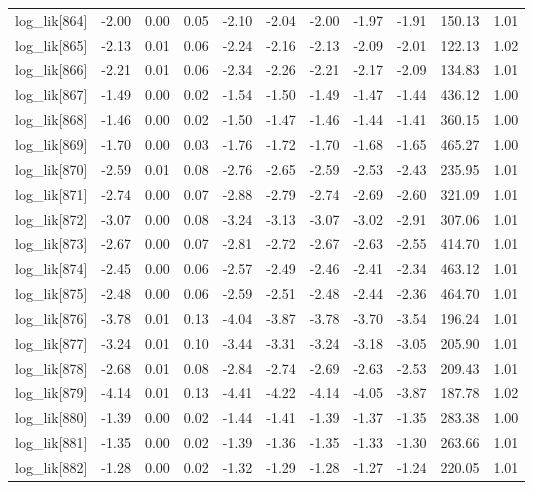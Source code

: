 \begin{table}[ht]
\begin{tabular}{rrrrrrrrrrr}
  log\_lik[864] & -2.00 & 0.00 & 0.05 & -2.10 & -2.04 & -2.00 & -1.97 & -1.91 & 150.13 & 1.01 \\ 
  log\_lik[865] & -2.13 & 0.01 & 0.06 & -2.24 & -2.16 & -2.13 & -2.09 & -2.01 & 122.13 & 1.02 \\ 
  log\_lik[866] & -2.21 & 0.01 & 0.06 & -2.34 & -2.26 & -2.21 & -2.17 & -2.09 & 134.83 & 1.01 \\ 
  log\_lik[867] & -1.49 & 0.00 & 0.02 & -1.54 & -1.50 & -1.49 & -1.47 & -1.44 & 436.12 & 1.00 \\ 
  log\_lik[868] & -1.46 & 0.00 & 0.02 & -1.50 & -1.47 & -1.46 & -1.44 & -1.41 & 360.15 & 1.00 \\ 
  log\_lik[869] & -1.70 & 0.00 & 0.03 & -1.76 & -1.72 & -1.70 & -1.68 & -1.65 & 465.27 & 1.00 \\ 
  log\_lik[870] & -2.59 & 0.01 & 0.08 & -2.76 & -2.65 & -2.59 & -2.53 & -2.43 & 235.95 & 1.01 \\ 
  log\_lik[871] & -2.74 & 0.00 & 0.07 & -2.88 & -2.79 & -2.74 & -2.69 & -2.60 & 321.09 & 1.01 \\ 
  log\_lik[872] & -3.07 & 0.00 & 0.08 & -3.24 & -3.13 & -3.07 & -3.02 & -2.91 & 307.06 & 1.01 \\ 
  log\_lik[873] & -2.67 & 0.00 & 0.07 & -2.81 & -2.72 & -2.67 & -2.63 & -2.55 & 414.70 & 1.01 \\ 
  log\_lik[874] & -2.45 & 0.00 & 0.06 & -2.57 & -2.49 & -2.46 & -2.41 & -2.34 & 463.12 & 1.01 \\ 
  log\_lik[875] & -2.48 & 0.00 & 0.06 & -2.59 & -2.51 & -2.48 & -2.44 & -2.36 & 464.70 & 1.01 \\ 
  log\_lik[876] & -3.78 & 0.01 & 0.13 & -4.04 & -3.87 & -3.78 & -3.70 & -3.54 & 196.24 & 1.01 \\ 
  log\_lik[877] & -3.24 & 0.01 & 0.10 & -3.44 & -3.31 & -3.24 & -3.18 & -3.05 & 205.90 & 1.01 \\ 
  log\_lik[878] & -2.68 & 0.01 & 0.08 & -2.84 & -2.74 & -2.69 & -2.63 & -2.53 & 209.43 & 1.01 \\ 
  log\_lik[879] & -4.14 & 0.01 & 0.13 & -4.41 & -4.22 & -4.14 & -4.05 & -3.87 & 187.78 & 1.02 \\ 
  log\_lik[880] & -1.39 & 0.00 & 0.02 & -1.44 & -1.41 & -1.39 & -1.37 & -1.35 & 283.38 & 1.00 \\ 
  log\_lik[881] & -1.35 & 0.00 & 0.02 & -1.39 & -1.36 & -1.35 & -1.33 & -1.30 & 263.66 & 1.01 \\ 
  log\_lik[882] & -1.28 & 0.00 & 0.02 & -1.32 & -1.29 & -1.28 & -1.27 & -1.24 & 220.05 & 1.01 \\ 

\end{tabular}
\end{table}
